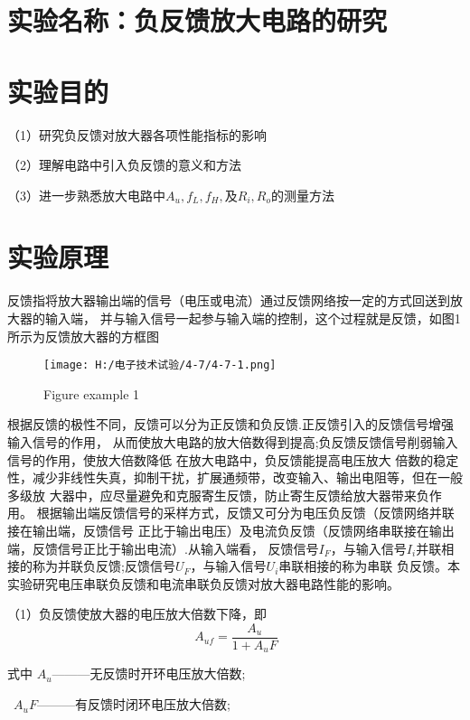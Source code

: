 \documentclass{article}
\begin{document}
	\section{ 实验名称：负反馈放大电路的研究}
    \section{ 实验目的}
     （1）研究负反馈对放大器各项性能指标的影响\par
	           （2）理解电路中引入负反馈的意义和方法\par
               （3）进一步熟悉放大电路中$A_u,f_L,f_H,$及$R_i,R_o$的测量方法\par
			   \section{ 实验原理}
			   反馈指将放大器输出端的信号（电压或电流）通过反馈网络按一定的方式回送到放大器的输入端，
			   并与输入信号一起参与输入端的控制，这个过程就是反馈，如图1所示为反馈放大器的方框图
			   \begin{figure}[h]
                \centering
                  \texttt{[image: H:/电子技术试验/4-7/4-7-1.png]}
                \caption{Figure example 1} 
              \end{figure}
			   根据反馈的极性不同，反馈可以分为正反馈和负反馈.正反馈引入的反馈信号增强输入信号的作用，
			   从而使放大电路的放大倍数得到提高;负反馈反馈信号削弱输入信号的作用，使放大倍数降低
			   在放大电路中，负反馈能提高电压放大
			   倍数的稳定性，减少非线性失真，抑制干扰，扩展通频带，改变输入、输出电阻等，但在一般多级放
			   大器中，应尽量避免和克服寄生反馈，防止寄生反馈给放大器带来负作用。
			   根据输出端反馈信号的采样方式，反馈又可分为电压负反馈（反馈网络并联接在输出端，反馈信号
			   正比于输出电压）及电流负反馈（反馈网络串联接在输出端，反馈信号正比于输出电流）.从输入端看，
			   反馈信号$I_F$，与输入信号$I_i$并联相接的称为并联负反馈;反馈信号$U_F$，与输入信号$U_i$串联相接的称为串联
			   负反馈。本实验研究电压串联负反馈和电流串联负反馈对放大器电路性能的影响。\par
			   （1）负反馈使放大器的电压放大倍数下降，即
			   \begin{equation}
                \ A_{uf}=\frac{A_u}{1+A_{u}F}
			   \end{equation}
               \par
			       式中 $A_u$———无反馈时开环电压放大倍数;\par
			  \, \qquad $A_{u}F$———有反馈时闭环电压放大倍数;  \par
\end{document}
